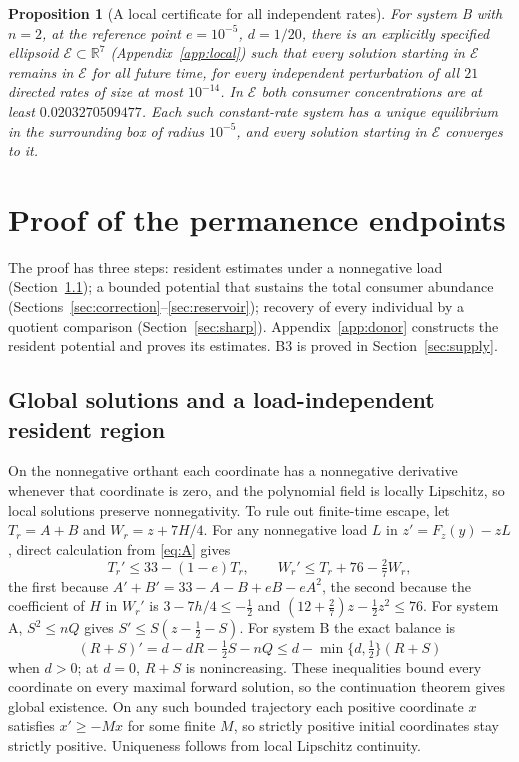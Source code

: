 \documentclass[11pt,a4paper]{article}
\theoremstyle{plain}
\newtheorem{proposition}[theorem]{Proposition}
\theoremstyle{definition}
\theoremstyle{remark}
\newcommand{\R}{\mathbb R}
\newcommand{\cE}{\mathcal E}
\begin{document}
\begin{proposition}[A local certificate for all independent rates]\label{prop:local}
For system B with $n=2$, at the reference point $e=10^{-5}$, $d=1/20$, there is an explicitly specified ellipsoid $\cE\subset\R^7$ (Appendix~\ref{app:local}) such that every solution starting in $\cE$ remains in $\cE$ for all future time, for every independent perturbation of all $21$ directed rates of size at most $10^{-14}$. In $\cE$ both consumer concentrations are at least $0.0203270509477$. Each such constant-rate system has a unique equilibrium in the surrounding box of radius $10^{-5}$, and every solution starting in $\cE$ converges to it.
\end{proposition}

\section{Proof of the permanence endpoints}\label{sec:proof}
The proof has three steps: resident estimates under a nonnegative load (Section~\ref{sec:resident}); a bounded potential that sustains the total consumer abundance (Sections~\ref{sec:correction}--\ref{sec:reservoir}); recovery of every individual by a quotient comparison (Section~\ref{sec:sharp}). Appendix~\ref{app:donor} constructs the resident potential and proves its estimates. B3 is proved in Section~\ref{sec:supply}.

\subsection{Global solutions and a load-independent resident region}\label{sec:resident}
On the nonnegative orthant each coordinate has a nonnegative derivative whenever that coordinate is zero, and the polynomial field is locally Lipschitz, so local solutions preserve nonnegativity. To rule out finite-time escape, let $T_r=A+B$ and $W_r=z+7H/4$. For any nonnegative load $L$ in $z'=F_z(y)-zL$, direct calculation from \eqref{eq:A} gives
\begin{equation}\label{eq:globalbounds}
T_r'\le33-(1-e)T_r,\qquad W_r'\le T_r+76-\tfrac27W_r,
\end{equation}
the first because $A'+B'=33-A-B+eB-eA^2$, the second because the coefficient of $H$ in $W_r'$ is $3-7h/4\le-\tfrac12$ and $(12+\tfrac27)z-\tfrac12z^2\le76$. For system A, $S^2\le nQ$ gives $S'\le S(z-\tfrac12-S)$. For system B the exact balance is
\begin{equation}\label{eq:balance}
(R+S)'=d-dR-\tfrac12S-nQ\le d-\min\{d,\tfrac12\}(R+S)
\end{equation}
when $d>0$; at $d=0$, $R+S$ is nonincreasing. These inequalities bound every coordinate on every maximal forward solution, so the continuation theorem \cite{Hale1980} gives global existence. On any such bounded trajectory each positive coordinate $x$ satisfies $x'\ge-Mx$ for some finite $M$, so strictly positive initial coordinates stay strictly positive. Uniqueness follows from local Lipschitz continuity.
\end{document}
